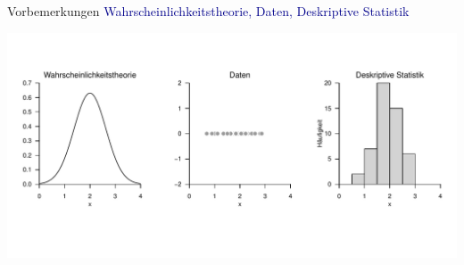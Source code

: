 \documentclass[
  8pt,
  ignorenonframetext,
]{beamer}
\begin{document}
\begin{frame}{Vorbemerkungen}
\protect\hypertarget{vorbemerkungen-3}{}
\textcolor{darkblue}{Wahrscheinlichkeitstheorie, Daten, Deskriptive Statistik}

\begin{center}\includegraphics[width=1\linewidth]{5_Abbildungen/mvda_5_univariate_statistik} \end{center}
\end{frame}
\end{document}
